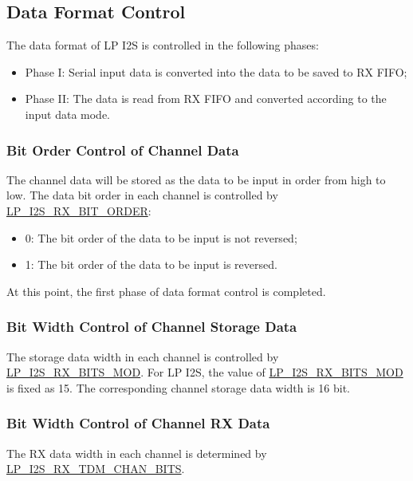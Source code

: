 \documentclass[main\_\_EN.tex]{subfiles}
\begin{document}
\subsection{Data Format Control}

The data format of LP I2S is controlled in the following phases:

\begin{itemize}
    \item Phase I: Serial input data is converted into the data to be saved to RX FIFO;
    \item Phase II: The data is read from RX FIFO and converted according to the input data mode.
\end{itemize}

\subsubsection{Bit Order Control of Channel Data}

The channel data will be stored as the data to be input in order from high to low. The data bit order in each channel is controlled by \hyperref[fielddesc:LPI2SRXBITORDER]{LP\_I2S\_RX\_BIT\_ORDER}:
\begin{itemize}
\item 0: The bit order of the data to be input is not reversed;
\item 1: The bit order of the data to be input is reversed.
\end{itemize}
At this point, the first phase of data format control is completed.

\subsubsection{Bit Width Control of Channel Storage Data}

The storage data width in each channel is controlled by \hyperref[fielddesc:LPI2SRXBITSMOD]{LP\_I2S\_RX\_BITS\_MOD}. For \chipname{} LP I2S, the value of \hyperref[fielddesc:LPI2SRXBITSMOD]{LP\_I2S\_RX\_BITS\_MOD} is fixed as 15. The corresponding channel storage data width is 16 bit.

\subsubsection{Bit Width Control of Channel RX Data} 

The RX data width in each channel is determined by \hyperref[fielddesc:LPI2SRXTDMCHANBITS]{LP\_I2S\_RX\_TDM\_CHAN\_BITS}.
\end{document}
